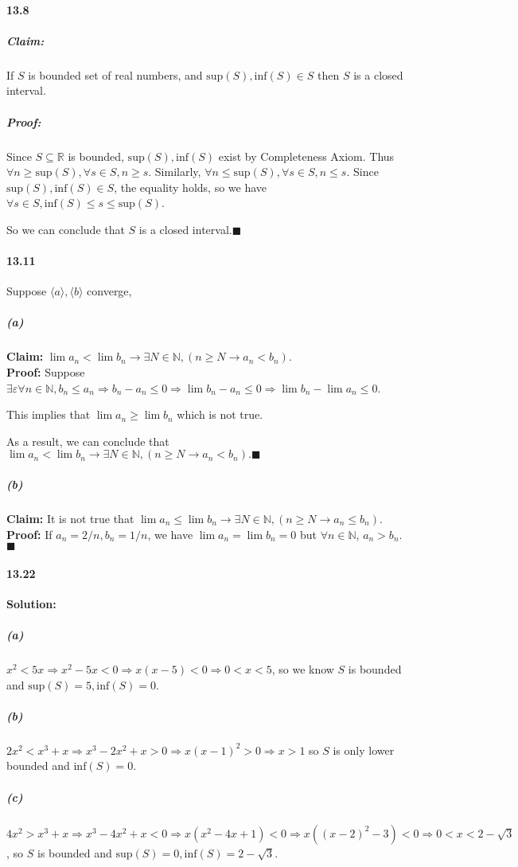\documentclass[11pt]{article}
\begin{document}
	\paragraph{13.8}
		\subparagraph{Claim:}
			If $S$ is bounded set of real numbers, and $\mathrm{sup}(S), \mathrm{inf}(S) \in S$ then $S$ is a closed interval.
		\subparagraph{Proof:}
			Since $S \subseteq \mathbb{R}$ is bounded, $\mathrm{sup}(S), \mathrm{inf}(S)$ exist by Completeness Axiom. Thus $\forall n \geq \mathrm{sup}(S), \forall s \in S, n \geq s$. Similarly,  $\forall n \leq \mathrm{sup}(S), \forall s \in S, n \leq s$. Since $\mathrm{sup}(S), \mathrm{inf}(S) \in S$, the equality holds, so we have $\forall s \in S, \mathrm{inf}(S) \leq s \leq \mathrm{sup}(S)$.
			
			So we can conclude that $S$ is a closed interval.$\blacksquare$
	\paragraph{13.11} Suppose $\langle a\rangle, \langle b\rangle$ converge,
		\subparagraph{(a)}
			\textbf{Claim:} $\lim a_n < \lim b_n \rightarrow \exists N \in \mathbb{N}, (n \geq N \rightarrow a_n < b_n)$.\\
			
			\textbf{Proof:}
				Suppose $\exists \varepsilon \forall n \in \mathbb{N}, b_n \leq a_n \Rightarrow b_n - a_n \leq 0 \Rightarrow \lim b_n - a_n \leq 0 \Rightarrow \lim b_n - \lim a_n \leq 0$.
				
				This implies that $\lim a_n \geq \lim b_n$ which is not true.
				
				As a result, we can conclude that $\lim a_n < \lim b_n \rightarrow \exists N \in \mathbb{N}, (n \geq N \rightarrow a_n < b_n).\blacksquare$
		\subparagraph{(b)} 
			\textbf{Claim:}	It is not true that $\lim a_n \leq \lim b_n \rightarrow \exists N \in \mathbb{N}, (n \geq N \rightarrow a_n \leq b_n)$.\\
			
			\textbf{Proof:} If $a_n = 2/n, b_n = 1/n$, we have $\lim a_n = \lim b_n = 0$ but $\forall n \in \mathbb{N}$, $a_n > b_n$.$\blacksquare$
	\paragraph{13.22}\textbf{Solution:}
		\subparagraph{(a)}
			$x^2 < 5x \Rightarrow x^2 - 5x < 0 \Rightarrow x(x - 5) < 0 \Rightarrow 0 < x < 5$, so we know $S$ is bounded and $\mathrm{sup}(S) = 5, \mathrm{inf}(S) = 0$.
		\subparagraph{(b)}
			$2x^2 < x^3 + x \Rightarrow x^3 - 2x^2 + x > 0 \Rightarrow x(x - 1)^2 > 0 \Rightarrow x > 1$ so $S$ is only lower bounded and $\mathrm{inf}(S) = 0$.
		\subparagraph{(c)}
			$4x^2 > x^3 + x \Rightarrow x^3 - 4x^2 + x < 0 \Rightarrow x(x^2 - 4x + 1) < 0 \Rightarrow x((x - 2)^2 - 3) < 0 \Rightarrow  0 < x < 2 - \sqrt{3}$, so $S$ is bounded and $\mathrm{sup}(S) = 0, \mathrm{inf}(S) = 2 - \sqrt{3}$.\\
\end{document}
